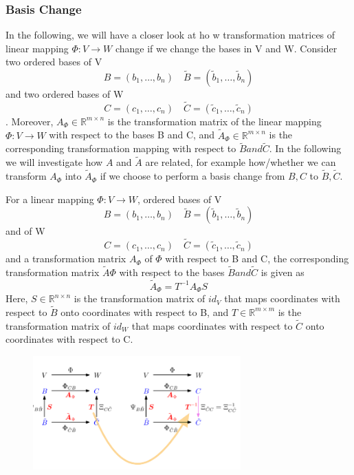 \subsubsection*{Basis Change}
In the following, we will have a closer look at ho w transformation matrices of linear mapping $\Phi: V \longrightarrow W$ change if we change the bases in V and W. Consider two ordered bases of V
\[ 
    B=(b_{1}, \ldots,b_{n}) \quad \tilde{B} = (\tilde{b}_{1}, \ldots,\tilde{b}_{n})
\]
and two ordered bases of W
\[ 
    C=(c_{1}, \ldots,c_{n}) \quad \tilde{C} = (\tilde{c}_{1}, \ldots,\tilde{c}_{n})
\]. Moreover, $A_\Phi \in \mathbb{R}^{m \times n}$ is the transformation matrix of the linear mapping $\Phi: V \longrightarrow W$ with respect to the bases B and C, and $\tilde{A}_\Phi \in \mathbb{R}^{m\times n}$ is the corresponding transformation mapping with respect to $\tilde{B} and \tilde{C}$. In the following we will investigate how $A$ and $\tilde{A}$ are related, for example how/whether we can transform $A_\Phi$ into $\tilde{A}_\Phi$ if we choose to perform a basis change from $B,C$ to $\tilde{B},\tilde{C}$.
\begin{theorem}
    For a linear mapping $\Phi: V \longrightarrow W$, ordered bases of V
    \[ 
        B=(b_{1}, \ldots,b_{n}) \quad \tilde{B} = (\tilde{b}_{1}, \ldots,\tilde{b}_{n})
    \]and  of W
    \[ 
        C=(c_{1}, \ldots,c_{n}) \quad \tilde{C} = (\tilde{c}_{1}, \ldots,\tilde{c}_{n}) 
    \]
    and a transformation matrix $A_\Phi$ of $\Phi$ with respect to B and C, the corresponding transformation matrix $\tilde{A}\Phi$ with respect to the bases $\tilde{B} and \tilde{C}$ is given as 
    \[ 
        \tilde{A}_\Phi = T^{-1} A_\Phi S 
    \]
    Here, $S \in \mathbb{R}^{n\times n}$ is the transformation matrix of $id_V$ that maps coordinates with respect to $\tilde{B}$ onto coordinates with respect to B, and $T \in \mathbb{R}^{m\times m}$ is the transformation matrix of $id_W$ that maps coordinates with respect to $\tilde{C}$ onto coordinates with respect to C.
    \begin{figure}[htbp]
        \centering
        \includegraphics[width=8cm]{Mathematical Background/basischange.png}
    \end{figure}
\end{theorem}

